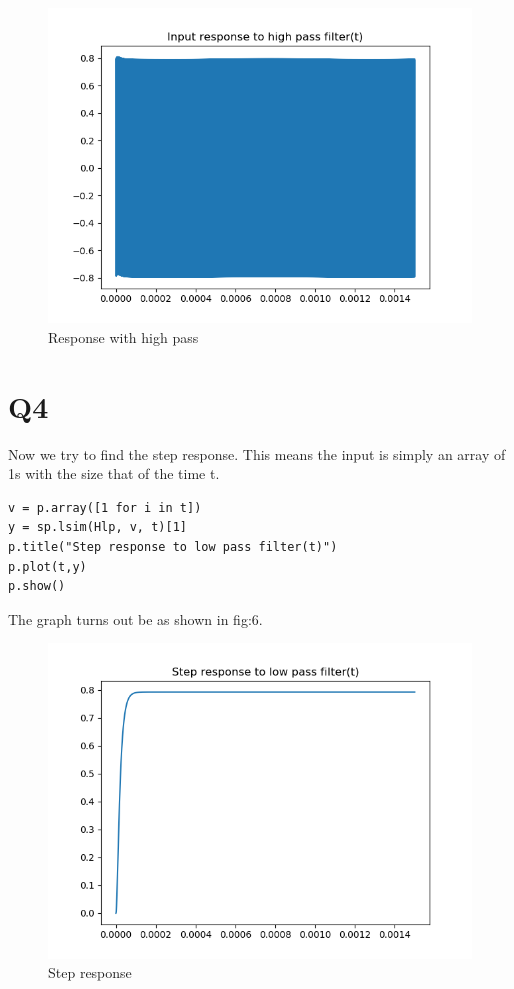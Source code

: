 \documentclass[12pt, a4paper]{report}
\begin{document}
  \begin{figure}
	\centering
	\includegraphics[scale=0.8]{figure_5..png}  %
	\caption{Response with high pass}
	\label{fig:5}
\end{figure}

\section*{Q4}
Now we try to find the step response. This means the input is simply an array of 1s with the size that of the time t.

\begin{verbatim}
v = p.array([1 for i in t])
y = sp.lsim(Hlp, v, t)[1]  
p.title("Step response to low pass filter(t)") 
p.plot(t,y)
p.show()
\end{verbatim}
The graph turns out be as shown in fig:6.
  \begin{figure}
	\centering
	\includegraphics[scale=0.8]{figure_6..png}  %
	\caption{Step response}
	\label{fig:6}
\end{figure}
\end{document}
